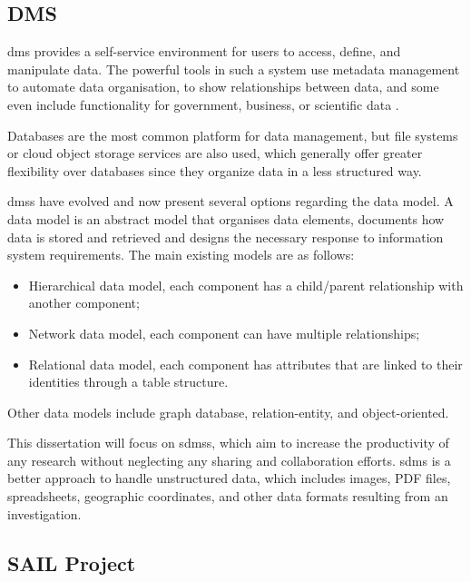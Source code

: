 \label{sec:background}

\subsection{DMS}
  
\gls{dms} provides a self-service environment for users to access, define, and manipulate data. The powerful tools in such a system use metadata management to automate data organisation, to show relationships between data, and some even include functionality for government, business, or scientific data \citep{7}.

Databases are the most common platform for data management, but file systems or cloud object storage services are also used, which generally offer greater flexibility over databases since they organize data in a less structured way. 
  
\gls{dms}s have evolved and now present several options regarding the data model. A data model is an abstract model that organises data elements, documents how data is stored and retrieved and designs the necessary response to information system requirements. The main existing models are as follows:
  
\begin{itemize}
    \item Hierarchical data model, each component has a child/parent relationship with another component;
    \item Network data model, each component can have multiple relationships;
    \item Relational data model, each component has attributes that are linked to their identities through a table structure.
\end{itemize}
  
Other data models include graph database, relation-entity, and object-oriented.
  
This dissertation will focus on \gls{sdms}s, which aim to increase the productivity of any research without neglecting any sharing and collaboration efforts. \gls{sdms} is a better approach to handle unstructured data, which includes images, PDF files, spreadsheets, geographic coordinates, and other data formats resulting from an investigation. 

\subsection{\label{tab:sail_project}SAIL Project}

